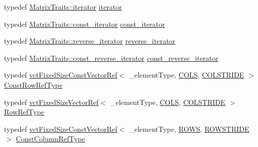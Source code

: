 \begin{DoxyCompactItemize}
\item 
typedef \hyperlink{classvct_fixed_size_matrix_traits_a677065481ada218e2559cdec92e97fd8}{Matrix\+Traits\+::iterator} \hyperlink{classvct_fixed_size_const_matrix_base_a4a1ca42894c9dac29243adf6ac266205}{iterator}
\item 
typedef \hyperlink{classvct_fixed_size_matrix_traits_a8f7178fb03f45772c705fba16e08065d}{Matrix\+Traits\+::const\+\_\+iterator} \hyperlink{classvct_fixed_size_const_matrix_base_a896eacc5ccf7915b3e109bf9dbded884}{const\+\_\+iterator}
\item 
typedef \hyperlink{classvct_fixed_size_matrix_traits_aa132098455575ae9bc4962c994273baa}{Matrix\+Traits\+::reverse\+\_\+iterator} \hyperlink{classvct_fixed_size_const_matrix_base_a7611e666969b09bd846c46a1a85401b0}{reverse\+\_\+iterator}
\item 
typedef \hyperlink{classvct_fixed_size_matrix_traits_a362cff0931f811552609307e80af3eab}{Matrix\+Traits\+::const\+\_\+reverse\+\_\+iterator} \hyperlink{classvct_fixed_size_const_matrix_base_a86918b3da51e15dce72b62abdc6378fa}{const\+\_\+reverse\+\_\+iterator}
\item 
typedef \hyperlink{classvct_fixed_size_const_vector_ref}{vct\+Fixed\+Size\+Const\+Vector\+Ref}$<$ \+\_\+element\+Type, \hyperlink{classvct_fixed_size_const_matrix_base_a05da4a844e1880e31d3052abb9a8063ba99583531bd0415ad92eed81fc931d592}{C\+O\+L\+S}, \hyperlink{classvct_fixed_size_const_matrix_base_a0aa9b864b8810dd6a50640c965564bd0aee4513ad3dee685fdda1bc2c264be993}{C\+O\+L\+S\+T\+R\+I\+D\+E} $>$ \hyperlink{classvct_fixed_size_const_matrix_base_a74355396eec7437755398c2810e0df41}{Const\+Row\+Ref\+Type}
\item 
typedef \hyperlink{classvct_fixed_size_vector_ref}{vct\+Fixed\+Size\+Vector\+Ref}$<$ \+\_\+element\+Type, \hyperlink{classvct_fixed_size_const_matrix_base_a05da4a844e1880e31d3052abb9a8063ba99583531bd0415ad92eed81fc931d592}{C\+O\+L\+S}, \hyperlink{classvct_fixed_size_const_matrix_base_a0aa9b864b8810dd6a50640c965564bd0aee4513ad3dee685fdda1bc2c264be993}{C\+O\+L\+S\+T\+R\+I\+D\+E} $>$ \hyperlink{classvct_fixed_size_const_matrix_base_a2ce1bc7d955f66d28462cb34b62d69b7}{Row\+Ref\+Type}
\item 
typedef \hyperlink{classvct_fixed_size_const_vector_ref}{vct\+Fixed\+Size\+Const\+Vector\+Ref}$<$ \+\_\+element\+Type, \hyperlink{classvct_fixed_size_const_matrix_base_a05da4a844e1880e31d3052abb9a8063ba628eeb65016492a84b40dad539262735}{R\+O\+W\+S}, \hyperlink{classvct_fixed_size_const_matrix_base_a0aa9b864b8810dd6a50640c965564bd0a1249f054e777d0972eee94e9e33c3f4f}{R\+O\+W\+S\+T\+R\+I\+D\+E} $>$ \hyperlink{classvct_fixed_size_const_matrix_base_a68ed47f84a2855832fa0c18fafda6843}{Const\+Column\+Ref\+Type}

\end{DoxyCompactItemize}
